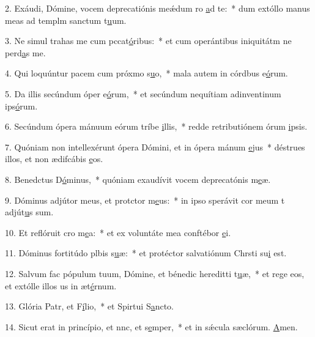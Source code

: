 2. Exáudi, Dómine, vocem deprecatiónis meǽdum ro \uline{a}d te:~* dum extóllo manus meas ad templm sanctum t\uline{u}um.\par 
3. Ne simul trahas me cum pccat\uline{ó}ribus:~* et cum operántibus iniquitátm ne perd\uline{a}s me.\par 
4. Qui loquúntur pacem cum próxmo s\uline{u}o,~* mala autem in córdbus e\uline{ó}rum.\par 
5. Da illis secúndum óper e\uline{ó}rum,~* et secúndum nequítiam adinventinum ips\uline{ó}rum.\par 
6. Secúndum ópera mánuum eórum tríbe \uline{i}llis,~* redde retributiónem órum \uline{i}psis.\par 
7. Quóniam non intellexérunt ópera Dómini, et in ópera mánum \uline{e}jus~* déstrues illos, et non ædifcábis \uline{e}os.\par 
8. Benedctus D\uline{ó}minus,~* quóniam exaudívit vocem deprecatónis m\uline{e}æ.\par 
9. Dóminus adjútor meus, et protctor m\uline{e}us:~* in ipso sperávit cor meum t adjút\uline{u}s sum.\par 
10. Et reflóruit cro m\uline{e}a:~* et ex voluntáte mea conftébor \uline{e}i.\par 
11. Dóminus fortitúdo plbis s\uline{u}æ:~* et protéctor salvatiónum Chrsti su\uline{i} est.\par 
12. Salvum fac pópulum tuum, Dómine, et bénedic hereditti t\uline{u}æ,~* et rege eos, et extólle illos us in æt\uline{é}rnum.\par 
13. Glória Patr, et F\uline{í}lio,~* et Spirtui S\uline{a}ncto.\par 
14. Sicut erat in princípio, et nnc, et s\uline{e}mper,~* et in sǽcula sæclórum. \uline{A}men.\par 
